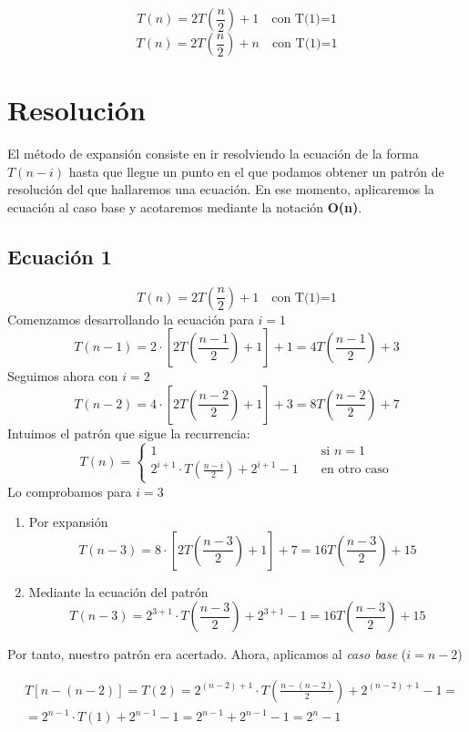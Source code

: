 \documentclass[12pt,spanish]{article}
\begin{document}
\begin{equation}
T(n)=2T(\frac{n}{2})+1 \quad \text{con T(1)=1}
\end{equation}
\begin{equation}
T(n)=2T(\frac{n}{2})+n \quad \text{con T(1)=1}
\end{equation}

\section{Resolución}
El método de expansión consiste en ir resolviendo la ecuación de la forma $T(n-i)$ hasta que llegue un punto en el que podamos obtener un patrón de resolución del que hallaremos una ecuación.
En ese momento, aplicaremos la ecuación al caso base y acotaremos mediante la notación \textbf{O(n)}.
\subsection{Ecuación 1}
\[T(n)=2T(\frac{n}{2})+1 \quad \text{con T(1)=1}\]
Comenzamos desarrollando la ecuación para $i=1$
\[T(n-1)=2 \cdot \left[2T(\frac{n-1}{2})+1\right]+1 = 4T(\frac{n-1}{2})+3\]
Seguimos ahora con $i=2$
\[T(n-2)=4 \cdot \left[2T(\frac{n-2}{2})+1\right]+3 = 8T(\frac{n-2}{2}) + 7 \]
Intuimos el patrón que sigue la recurrencia:
\[T(n)=
\begin{cases}
	1 & \quad \text{si } n = 1  \\
	2^{i+1} \cdot T(\frac{n-i}{2}) + 2^{i+1}-1 & \quad \text{en otro caso}
\end{cases}
\]
Lo comprobamos para $i=3$
\begin{enumerate}
\item Por expansión
\[ T(n-3)=8 \cdot \left[2T(\frac{n-3}{2})+1\right]+7=16T(\frac{n-3}{2})+15\]
\item Mediante la ecuación del patrón
\[ T(n-3)=2^{3+1} \cdot T(\frac{n-3}{2}) + 2^{3+1} - 1 = 16T(\frac{n-3}{2})+15 \]
\end{enumerate}
Por tanto, nuestro patrón era acertado. Ahora, aplicamos al \textit{caso base} ($i=n-2$)

\begin{equation}
\begin{split}
&T\left[n-(n-2)\right]=T(2)=2^{(n-2)+1} \cdot T(\frac{n-(n-2)}{2})+2^{(n-2)+1}-1= \\
&= 2^{n-1} \cdot T(1) + 2^{n-1}-1 = 2^{n-1} + 2^{n-1}-1 = 2^{n} -1 
\end{split}
\end{equation}
\end{document}
